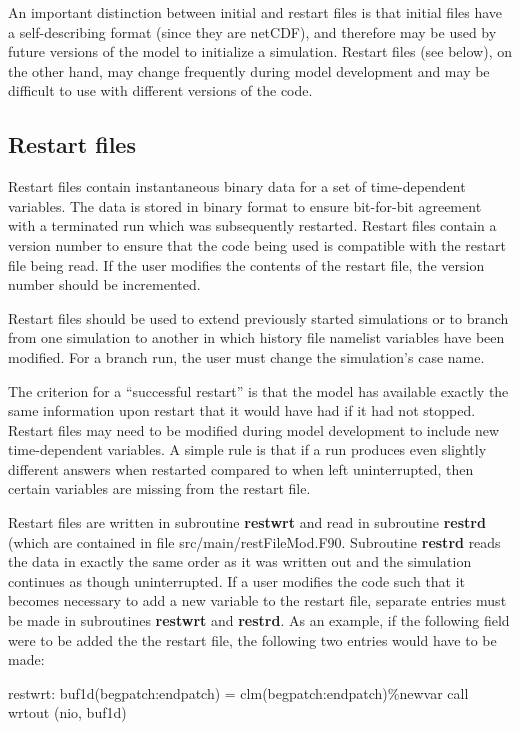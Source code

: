 \documentclass[]{article}
\begin{document}
An important distinction between initial and restart files is that
initial files have a self-describing format (since they are netCDF),
and therefore may be used by future versions of the model to
initialize a simulation. Restart files (see below), on the other hand,
may change frequently during model development and may be difficult to
use with different versions of the code.

\subsection {Restart files}

Restart files contain instantaneous binary data for a set of
time-dependent variables. The data is stored in binary format to
ensure bit-for-bit agreement with a terminated run which was
subsequently restarted. Restart files contain a version number to
ensure that the code being used is compatible with the restart file
being read. If the user modifies the contents of the restart file, the
version number should be incremented.

Restart files should be used to extend previously started simulations
or to branch from one simulation to another in which history file
namelist variables have been modified. For a branch run, the user must
change the simulation's case name.

The criterion for a ``successful restart'' is that the model has
available exactly the same information upon restart that it would have
had if it had not stopped. Restart files may need to be modified
during model development to include new time-dependent variables.  A
simple rule is that if a run produces even slightly different answers
when restarted compared to when left uninterrupted, then certain
variables are missing from the restart file.

Restart files are written in subroutine {\bf restwrt} and read in
subroutine {\bf restrd} (which are contained in file
src/main/restFileMod.F90.  Subroutine {\bf restrd} reads the data in
exactly the same order as it was written out and the simulation
continues as though uninterrupted. If a user modifies the code such
that it becomes necessary to add a new variable to the restart file,
separate entries must be made in subroutines {\bf restwrt} and {\bf
restrd}. As an example, if the following field were to be added the
the restart file, the following two entries would have to be made:
\medskip

\noindent 
\newline restwrt: 
\newline buf1d(begpatch:endpatch) = clm(begpatch:endpatch)\%newvar
\newline call wrtout (nio, buf1d) 
\end{document}
